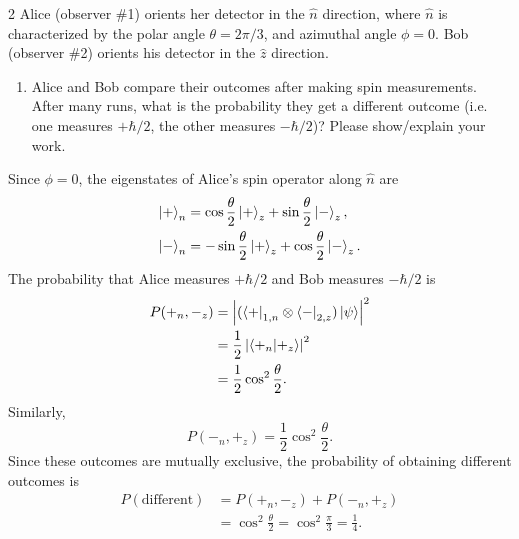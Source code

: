 \documentclass[11pt]{article}
\begin{document}
\begin{problem}{2}
  Alice (observer \#1) orients her detector in the \(\hat{n}\) direction, where \(\hat{n}\) is characterized by the polar angle \(\theta=2\pi/3\), and azimuthal angle \(\phi=0\).
  Bob (observer \#2) orients his detector in the \(\hat{z}\) direction.
  \begin{enumerate}[label=(\alph*),start=3]
    \item Alice and Bob compare their outcomes after making spin measurements.
      After many runs, what is the probability they get a different outcome (i.e. one measures \(+\hbar/2\), the other measures \(-\hbar/2\))?
      Please show/explain your work.
  \end{enumerate}
  \begin{answer}
Since \( \phi=0 \), the eigenstates of Alice's spin
  operator along \( \hat{n} \) are
  \begin{equation}
    \label{eq:p2-n-basis}
    \begin{aligned}
      \ket{+}_{n}
      &= \cos\frac{\theta}{2}\ket{+}_z
      + \sin\frac{\theta}{2}\ket{-}_z,\\
      \ket{-}_{n}
      &= -\sin\frac{\theta}{2}\ket{+}_z
      + \cos\frac{\theta}{2}\ket{-}_z.
    \end{aligned}
  \end{equation}
  The probability that Alice measures \( +\hbar/2 \)
  and Bob measures \( -\hbar/2 \) is
  \begin{equation}
    \label{eq:p2-prob-1}
    \begin{aligned}
      P(+_n,-_z)
      &= \left|
        (\bra{+}_{1,n}\otimes\bra{-}_{2,z})
        \ket{\psi}
      \right|^2\\
      &= \frac{1}{2}
      \left|\braket{+_n}{+_z}\right|^2\\
      &= \frac{1}{2}\cos^2\frac{\theta}{2}.
    \end{aligned}
  \end{equation}
  Similarly,
  \begin{equation}
    \label{eq:p2-prob-2}
    P(-_n,+_z)
    = \frac{1}{2}\cos^2\frac{\theta}{2}.
  \end{equation}
  Since these outcomes are mutually exclusive, the
  probability of obtaining different outcomes is
  \begin{equation}
    \label{eq:p2-prob-different}
    \begin{aligned}
      P(\text{different})
      &= P(+_n,-_z)+P(-_n,+_z)\\
      &= \cos^2\frac{\theta}{2}
      = \cos^2\frac{\pi}{3}
      = \frac{1}{4}.
    \end{aligned}
  \end{equation}
  \end{answer}
\end{problem}
\end{document}
